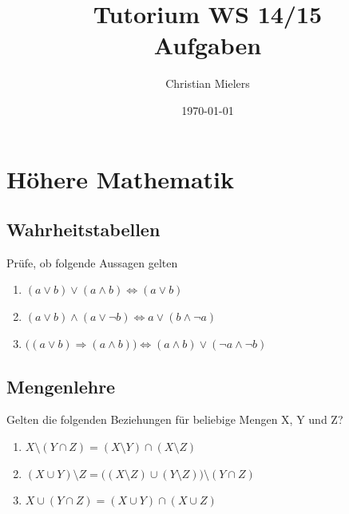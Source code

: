\documentclass[11pt, a4paper]{article}
\title{Tutorium WS 14/15 \\ Aufgaben}
\author{Christian Mielers}
\date{\today}
\begin{document}
\maketitle
\tableofcontents

\newpage
\section{Höhere Mathematik}
\subsection{Wahrheitstabellen}
Prüfe, ob folgende Aussagen gelten
\begin{enumerate}
	\item $(a \lor b) \lor (a \land b) \Leftrightarrow (a \lor b)$
	\item $(a \lor b) \land (a \lor \lnot b) \Leftrightarrow a \lor (b \land \lnot a)$
	\item $\big((a \lor b) \Rightarrow (a \land b) \big) \Leftrightarrow (a \land b) \lor (\lnot a \land \lnot b)$
\end{enumerate}

\subsection{Mengenlehre}
Gelten die folgenden Beziehungen für beliebige Mengen X, Y und Z?
\begin{enumerate}
	\item $X \setminus (Y \cap Z) = (X \setminus Y) \cap (X \setminus Z)$ %
	\item $(X \cup Y) \setminus Z = \big((X \setminus Z) \cup (Y \setminus Z)\big) \setminus (Y \cap Z)$ %
	\item $X \cup (Y \cap Z) = (X \cup Y) \cap (X \cup Z)$ %
\end{enumerate}
\end{document}
